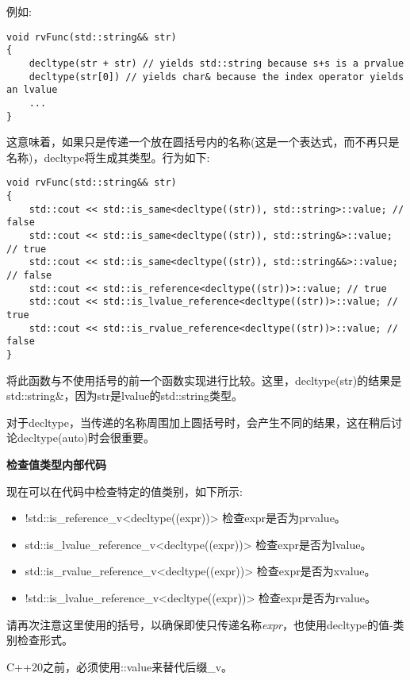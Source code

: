 例如:\par

\begin{lstlisting}[caption={}]
void rvFunc(std::string&& str)
{
	decltype(str + str) // yields std::string because s+s is a prvalue
	decltype(str[0]) // yields char& because the index operator yields an lvalue
	...
}
\end{lstlisting}

这意味着，如果只是传递一个放在圆括号内的名称(这是一个表达式，而不再只是名称)，decltype将生成其类型。行为如下:\par

\begin{lstlisting}[caption={}]
void rvFunc(std::string&& str)
{
	std::cout << std::is_same<decltype((str)), std::string>::value; // false
	std::cout << std::is_same<decltype((str)), std::string&>::value; // true
	std::cout << std::is_same<decltype((str)), std::string&&>::value; // false
	std::cout << std::is_reference<decltype((str))>::value; // true
	std::cout << std::is_lvalue_reference<decltype((str))>::value; // true
	std::cout << std::is_rvalue_reference<decltype((str))>::value; // false
}
\end{lstlisting}

将此函数与不使用括号的前一个函数实现进行比较。这里，decltype(str)的结果是std::string\&，因为str是lvalue的std::string类型。\par

对于decltype，当传递的名称周围加上圆括号时，会产生不同的结果，这在稍后讨论decltype(auto)时会很重要。\par

\hspace*{\fill} \par %
\textbf{检查值类型内部代码}

现在可以在代码中检查特定的值类别，如下所示:\par

\begin{itemize}
	\item !std::is\_reference\_v<decltype((expr))>
	检查expr是否为prvalue。
	\item std::is\_lvalue\_reference\_v<decltype((expr))>
	检查expr是否为lvalue。
	\item std::is\_rvalue\_reference\_v<decltype((expr))>
	检查expr是否为xvalue。
	\item !std::is\_lvalue\_reference\_v<decltype((expr))>
	检查expr是否为rvalue。
\end{itemize}

请再次注意这里使用的括号，以确保即使只传递名称\textit{expr}，也使用decltype的值-类别检查形式。\par

C++20之前，必须使用::value来替代后缀\_v。\par















